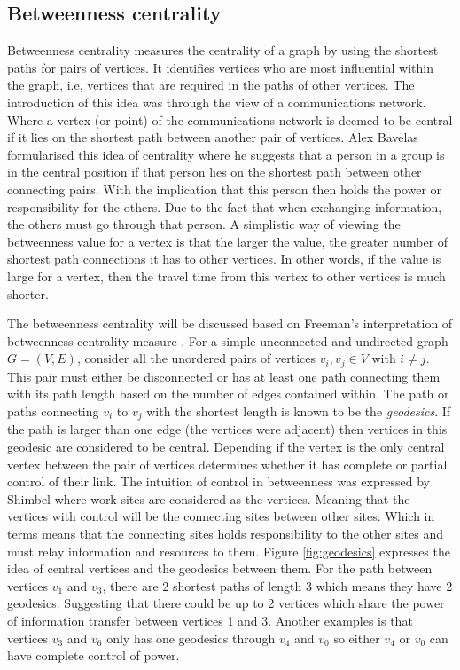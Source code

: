 \subsection{Betweenness centrality}
Betweenness centrality measures the centrality of a graph by using the shortest paths for pairs of vertices. It identifies vertices who are most influential within the graph, i.e, vertices that are required in the paths of other vertices. The introduction of this idea was through the view of a communications network. Where a vertex (or point) of the communications network is deemed to be central if it lies on the shortest path between another pair of vertices. Alex Bavelas \cite{bavelas1948mathematical} formularised this idea of centrality where he suggests that a person in a group is in the central position if that person lies on the shortest path between other connecting pairs. With the implication that this person then holds the power or responsibility for the others. Due to the fact that when exchanging information, the others must go through that person. A simplistic way of viewing the betweenness value for a vertex is that the larger the value, the greater number of shortest path connections it has to other vertices. In other words, if the value is large for a vertex, then the travel time from this vertex to other vertices is much shorter. 

The betweenness centrality will be discussed based on Freeman's interpretation of betweenness centrality measure \cite{freeman1977set}. For a simple unconnected and undirected graph $G = (V, E)$, consider all the unordered pairs of vertices $v_i, v_j \in V$ with $i \ne j$. This pair must either be disconnected or has at least one path connecting them with its path length based on the number of edges contained within. The path or paths connecting $v_i$ to $v_j$ with the shortest length is known to be the \emph{geodesics}. If the path is larger than one edge (the vertices were adjacent) then vertices in this geodesic are considered to be central. Depending if the vertex is the only central vertex between the pair of vertices determines whether it has complete or partial control of their link. The intuition of control in betweenness was expressed by Shimbel \cite{shimbel1953structural} where work sites are considered as the vertices. Meaning that the vertices with control will be the connecting sites between other sites. Which in terms means that the connecting sites holds responsibility to the other sites and must relay information and resources to them. Figure \ref{fig:geodesics} expresses the idea of central vertices and the geodesics between them. For the path between vertices $v_1$ and $v_3$, there are 2 shortest paths of length 3 which means they have 2 geodesics. Suggesting that there could be up to 2 vertices which share the power of information transfer between vertices 1 and 3. Another examples is that vertices $v_3$ and $v_6$ only has one geodesics through $v_4$ and $v_0$ so either $v_4$ or $v_0$ can have complete control of power.

